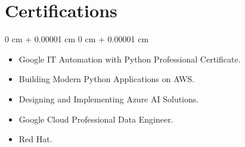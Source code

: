 \documentclass[10pt, letterpaper]{article}
\newenvironment{highlights}{
    \begin{itemize}[
        topsep=0.10 cm,
        parsep=0.10 cm,
        partopsep=0pt,
        itemsep=0pt,
        leftmargin=0 cm + 10pt
    ]
}{
    \end{itemize}
} %
\newenvironment{onecolentry}{
    \begin{adjustwidth}{
        0 cm + 0.00001 cm
    }{
        0 cm + 0.00001 cm
    }
}{
    \end{adjustwidth}
} %
\begin{document}
    \section{Certifications}
\begin{onecolentry}
    \begin{highlights}
        \item Google IT Automation with Python Professional Certificate.
        \item Building Modern Python Applications on AWS.
        \item Designing and Implementing Azure AI Solutions.
        \item Google Cloud Professional Data Engineer.
        \item Red Hat.
    \end{highlights}
\end{onecolentry}
\end{document}
